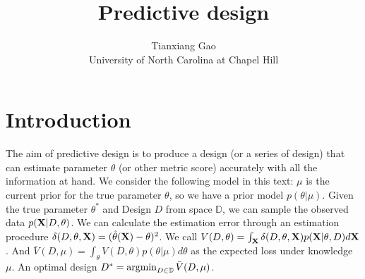\documentclass{article}
\begin{document}
\title{Predictive design}
\author{Tianxiang Gao \\
University of North Carolina at Chapel Hill}
\maketitle

\section{Introduction}
The aim of predictive design is to produce a design (or a series of design) that can estimate parameter $\theta$ (or other metric score) accurately with all the information at hand. We consider the following model in this text: $\mu$ is the current prior for the true parameter $\theta$, so we have a prior model $p(\theta|\mu)$. Given the true parameter $\theta^*$ and Design $D$ from space $\mathbb{D}$, we can sample the observed data $p(\mathbf{X}|D,\theta)$. We can calculate the estimation error through an estimation procedure $\delta(D,\theta,\mathbf{X}) = (\hat{\theta}(\mathbf{X}) - \theta)^2$. We call $V(D,\theta) = \int_{\mathbf{X}} \delta(D,\theta,\mathbf{X}) p(\mathbf{X}|\theta,D) d\mathbf{X}$. And $\bar{V}(D,\mu) = \int_{\theta} V(D,\theta) p(\theta|\mu) d\theta$ as the expected loss under knowledge $\mu$. An optimal design $D^* = \mathop{\rm argmin}_{D \in \mathbb{D}} \bar{V}(D,\mu)$.




\end{document}
